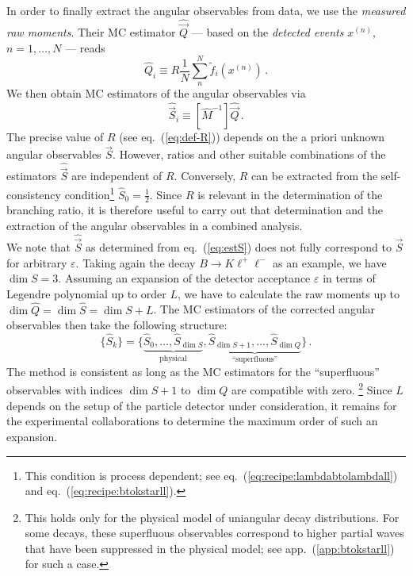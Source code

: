 \documentclass[aps,prd,reprint,nofootinbib,preprintnumbers]{revtex4}
\newcommand{\est}[1]{\widehat{#1}}
\newcommand{\refapp}[1]{app.~(\ref{app:#1})}
\newcommand{\refeq}[1]{eq.~(\ref{eq:#1})}
\let\eps\varepsilon
\newcommand{\vecest}[1]{\widehat{\vec{#1}}}
\begin{document}
In order to finally extract the angular observables from data, we use the \emph{measured raw moments}. Their MC estimator
$\vecest{Q}$ --- based on the \emph{detected events} $x^{(n)}$, $n=1,\dots,N$ --- reads
\begin{equation}
    \est{Q}_i \equiv R \frac{1}{N} \sum_n^N \tilde{f}_i(x^{(n)})\,.
\end{equation}
We then obtain MC estimators of the angular observables via
\begin{equation}
    \label{eq:estS}
    \vecest{S}_i \equiv \left[\est{M}^{-1}\right] \vecest{Q}\,.
\end{equation}
The precise value of $R$ (see \refeq{def-R}) depends on the a priori
unknown angular observables $\vec S$.  However, ratios and
other suitable combinations of the estimators $\vecest{S}$
are independent of $R$. Conversely, $R$ can be
extracted from the self-consistency condition\footnote{This condition
  is process dependent; see \refeq{recipe:lambdabtolambdall} and
  \refeq{recipe:btokstarll}.}  $\hat{S}_0 = \frac{1}{2}$. Since $R$ is
relevant in the determination of the branching ratio, it is therefore
useful to carry out that determination and the extraction of the
angular observables in a combined analysis.\\

We note that $\vecest{S}$ as determined from \refeq{estS} does not fully correspond to $\vec{S}$
for arbitrary $\eps$. Taking again the decay $B\to K\ell^+\ell^-$
as an example, we have $\dim S = 3$. Assuming an expansion of the detector acceptance $\eps$
in terms of Legendre polynomial up to order $L$, we have to calculate the raw moments up
to $\dim \est{Q} = \dim \est{S} = \dim S + L$. The MC estimators of the corrected angular observables
then take the following structure:
\begin{equation}
    \lbrace \est{S}_k \rbrace = \lbrace \underbrace{\est{S}_0, \dots, \est{S}_{\dim S}}_\text{physical}, \underbrace{\est{S}_{\dim S + 1}, \dots, \est{S}_{\dim Q}}_\text{``superfluous''}\rbrace\,.
\end{equation}
The method is consistent as long as the MC estimators for the ``superfluous'' observables with indices $\dim S + 1$ to $\dim Q$
are compatible with zero. \footnote{This holds only for the physical model of uniangular decay distributions. For some decays, these superfluous observables
correspond to higher partial waves that have been suppressed in the physical model; see \refapp{btokstarll} for such a case.}
Since $L$ depends on the setup of the particle detector under consideration, it remains for
the experimental collaborations to determine the maximum order of such an expansion.\\
\end{document}
